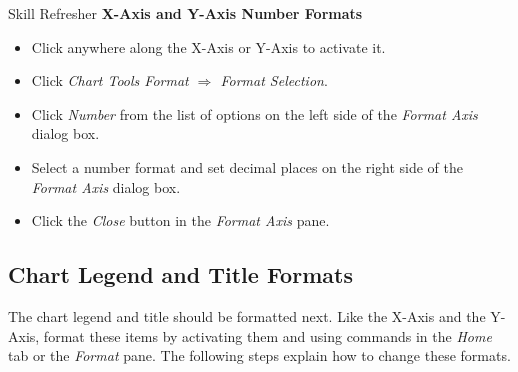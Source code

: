 \begin{center}
	\begin{sklbox}{Skill Refresher}
		\textbf{X-Axis and Y-Axis Number Formats}
		\\
		\begin{itemize}
			\setlength{\itemsep}{0pt}
			\setlength{\parskip}{0pt}
			\setlength{\parsep}{0pt}

			\item Click anywhere along the X-Axis or Y-Axis to activate it.
			\item Click \textit{Chart Tools Format $ \Rightarrow $ Format Selection}.
			\item Click \textit{Number} from the list of options on the left side of the \textit{Format Axis} dialog box.
			\item Select a number format and set decimal places on the right side of the \textit{Format Axis} dialog box.
			\item Click the \textit{Close} button in the \textit{Format Axis} pane.
			
		\end{itemize}
	\end{sklbox}
\end{center}

\subsection{Chart Legend and Title Formats}

The chart legend and title should be formatted next. Like the X-Axis and the Y-Axis, format these items by activating them and using commands in the \textit{Home} tab or the \textit{Format} pane. The following steps explain how to change these formats.

